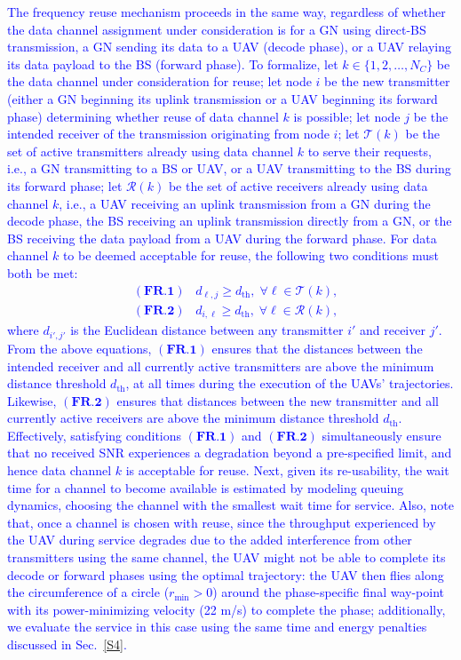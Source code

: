 \documentclass[12pt, draftcls, onecolumn]{IEEEtran}
\theoremstyle{plain}
\theoremstyle{definition}
\theoremstyle{remark}
\newcommand\hlt[1]{\textcolor{blue}{#1}}
\begin{document}
\hlt{The frequency reuse mechanism proceeds in the same way, regardless of whether the data channel assignment under consideration is for a GN using direct-BS transmission, a GN sending its data to a UAV (decode phase), or a UAV relaying its data payload to the BS (forward phase). To formalize, let $k{\in}\{1,2,{\dots},N_C\}$ be the data channel under consideration for reuse; let node $i$ be the new transmitter (either a GN beginning its uplink transmission or a UAV beginning its forward phase) determining whether reuse of data channel $k$ is possible; let node $j$ be the intended receiver of the transmission originating from node $i$; let $\mathcal T (k)$ be the set of active transmitters already using data channel $k$ to serve their requests, i.e., a GN transmitting to a BS or UAV, or a UAV transmitting to the BS during its forward phase; let $\mathcal R (k)$ be the set of active receivers already using data channel $k$, i.e., a UAV receiving an uplink transmission from a GN during the decode phase, the BS receiving an uplink transmission directly from a GN, or the BS receiving the data payload from a UAV during the forward phase. For data channel $k$ to be deemed acceptable for reuse, the following two conditions must both be met:
\begin{align}
    &(\textbf{FR.1}) \;\;\; d_{\ell,j} \geq d_{\mathrm{th}}, \; \forall \ell \in \mathcal T (k), \\
    &(\textbf{FR.2}) \;\;\; d_{i,\ell} \geq d_{\mathrm{th}}, \; \forall \ell \in \mathcal R (k),
\end{align}
where $d_{i',j'}$ is the Euclidean distance between any transmitter $i'$ and receiver $j'$. From the above equations, $(\textbf{FR.1})$ ensures that the distances between the intended receiver and all currently active transmitters are above the minimum distance threshold $d_{\mathrm{th}}$, at all times during the execution of the UAVs' trajectories. Likewise, $(\textbf{FR.2})$ ensures that distances between the new transmitter and all currently active receivers are above the minimum distance threshold $d_{\mathrm{th}}$. Effectively, satisfying conditions $(\textbf{FR.1})$ and $(\textbf{FR.2})$ simultaneously ensure that no received SNR experiences a degradation beyond a pre-specified limit, and hence data channel $k$ is acceptable for reuse. Next, given its re-usability, the wait time for a channel to become available is estimated by modeling queuing dynamics, choosing the channel with the smallest wait time for service. Also, note that, once a channel is chosen with reuse, since the throughput experienced by the UAV during service degrades due to the added interference from other transmitters using the same channel, the UAV might not be able to complete its decode or forward phases using the optimal trajectory: the UAV then flies along the circumference of a circle ($r_{\min}{>}0$) around the phase-specific final way-point with its power-minimizing velocity (22 m/s) to complete the phase; additionally, we evaluate the service in this case using the same time and energy penalties discussed in Sec.~\ref{S4}.}
\end{document}
